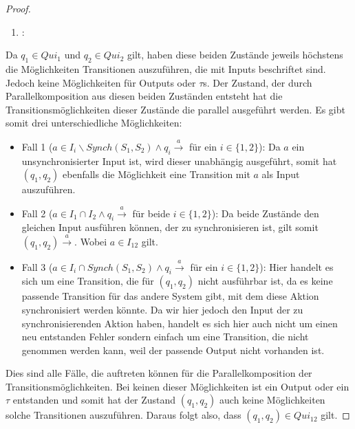 \begin{proof}
  ~
  \begin{enumerate}
    \item \hspace{-0.2cm}:
  \end{enumerate}
  \vspace{-0.3cm}
  Da $q_1\in Qui_1$ und $q_2\in Qui_2$ gilt, haben
  diese beiden Zustände jeweils höchstens die Möglichkeiten Transitionen
  auszuführen, die mit Inputs beschriftet sind. Jedoch keine Möglichkeiten für
  Outputs oder $\tau$s. Der Zustand, der durch Parallelkomposition aus diesen
  beiden Zuständen entsteht hat die Transitionsmöglichkeiten dieser Zustände
  die parallel ausgeführt werden. Es gibt somit drei unterschiedliche
  Möglichkeiten:
  \begin{itemize}
    \item Fall 1 ($a\in I_i\backslash Synch(S_1,S_2)\wedge q_i
      \overset{a}{\rightarrow}$ für ein $i\in \{1,2\}$): Da $a$ ein
      unsynchronisierter Input ist, wird dieser unabhängig ausgeführt, somit hat
      $(q_1,q_2)$ ebenfalls die Möglichkeit eine Transition mit $a$ als Input
      auszuführen.
    \item Fall 2 ($a\in I_1\cap I_2\wedge q_i \overset{a}{\rightarrow}$ für
      beide $i\in \{1,2\}$): Da beide Zustände den gleichen Input ausführen
      können, der zu synchronisieren ist, gilt somit $(q_1,q_2)
      \overset{a}{\rightarrow}$. Wobei $a\in I_{12}$ gilt.
    \item Fall 3 ($a\in I_i\cap Synch(S_1,S_2)\wedge q_i
      \overset{a}{\rightarrow}$ für ein $i\in \{1,2\}$): Hier handelt es sich
      um eine Transition, die für $(q_1,q_2)$ nicht ausführbar ist, da es keine
      passende Transition für das andere System gibt, mit dem diese Aktion
      synchronisiert werden könnte. Da wir hier jedoch den Input der zu
      synchronisierenden Aktion haben, handelt es sich hier auch nicht um einen
      neu entstanden Fehler sondern einfach um eine Transition, die nicht
      genommen werden kann, weil der passende Output nicht vorhanden ist.
  \end{itemize}
  Dies sind alle Fälle, die auftreten können für die Parallelkomposition der
  Transitionsmöglichkeiten. Bei keinen dieser Möglichkeiten ist ein Output oder
  ein $\tau$ entstanden und somit hat der Zustand $(q_1,q_2)$ auch keine
  Möglichkeiten solche Transitionen auszuführen. Daraus folgt also, dass
  $(q_1,q_2)\in Qui_{12}$ gilt.


\end{proof}
